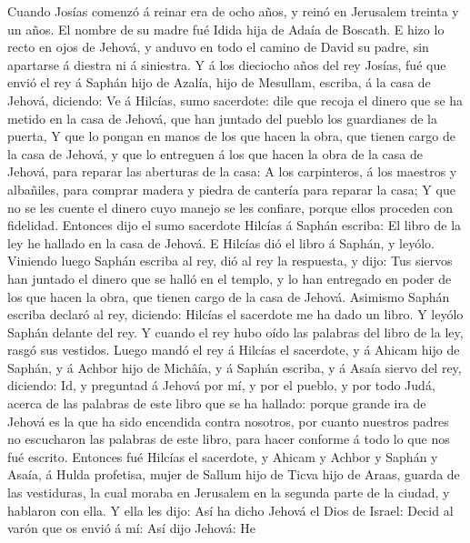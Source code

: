  Cuando Josías comenzó á reinar era de ocho años, y reinó
en Jerusalem treinta y un años. El nombre de su madre fué Idida hija de
Adaía de Boscath.  E hizo lo recto en ojos de Jehová, y
anduvo en todo el camino de David su padre, sin apartarse á diestra ni á
siniestra.  Y á los dieciocho años del rey Josías, fué que
envió el rey á Saphán hijo de Azalía, hijo de Mesullam, escriba, á la
casa de Jehová, diciendo:  Ve á Hilcías, sumo sacerdote:
dile que recoja el dinero que se ha metido en la casa de Jehová, que han
juntado del pueblo los guardianes de la puerta,  Y que lo
pongan en manos de los que hacen la obra, que tienen cargo de la casa de
Jehová, y que lo entreguen á los que hacen la obra de la casa de Jehová,
para reparar las aberturas de la casa:  A los carpinteros,
á los maestros y albañiles, para comprar madera y piedra de cantería
para reparar la casa;  Y que no se les cuente el dinero
cuyo manejo se les confiare, porque ellos proceden con fidelidad.
 Entonces dijo el sumo sacerdote Hilcías á Saphán escriba:
El libro de la ley he hallado en la casa de Jehová. E Hilcías dió el
libro á Saphán, y leyólo.  Viniendo luego Saphán escriba
al rey, dió al rey la respuesta, y dijo: Tus siervos han juntado el
dinero que se halló en el templo, y lo han entregado en poder de los que
hacen la obra, que tienen cargo de la casa de Jehová. 
Asimismo Saphán escriba declaró al rey, diciendo: Hilcías el sacerdote
me ha dado un libro. Y leyólo Saphán delante del rey.  Y
cuando el rey hubo oído las palabras del libro de la ley, rasgó sus
vestidos.  Luego mandó el rey á Hilcías el sacerdote, y á
Ahicam hijo de Saphán, y á Achbor hijo de Michâía, y á Saphán escriba, y
á Asaía siervo del rey, diciendo:  Id, y preguntad á
Jehová por mí, y por el pueblo, y por todo Judá, acerca de las palabras
de este libro que se ha hallado: porque grande ira de Jehová es la que
ha sido encendida contra nosotros, por cuanto nuestros padres no
escucharon las palabras de este libro, para hacer conforme á todo lo que
nos fué escrito.  Entonces fué Hilcías el sacerdote, y
Ahicam y Achbor y Saphán y Asaía, á Hulda profetisa, mujer de Sallum
hijo de Ticva hijo de Araas, guarda de las vestiduras, la cual moraba en
Jerusalem en la segunda parte de la ciudad, y hablaron con ella.
 Y ella les dijo: Así ha dicho Jehová el Dios de Israel:
Decid al varón que os envió á mí:  Así dijo Jehová: He
